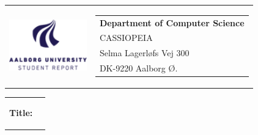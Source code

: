 \thispagestyle{empty}
\begin{titlepage}
    \setlength{\textwidth}{15cm}
    \noindent
    \begin{nopagebreak}
        {\samepage 
            \begin{tabular}{lr}
                \parbox{0.5\textwidth}{\raisebox{11mm}
                    {\includegraphics[height=2.2cm]{Grafik/aauLogoDa2}}
                } &
                \parbox{0.5\textwidth}{
                    \small
                    \begin{tabular}{l}
                        {\sf\small \textbf{Department of Computer Science }}\\
                        {\sf\small CASSIOPEIA} \\
                        {\sf\small Selma Lagerløfs Vej 300} \\
                        {\sf\small DK-9220 Aalborg Ø.} \\
                    \end{tabular}
                }
            \end{tabular}
            
            \noindent
            \begin{tabular}{cc}
                \parbox{7cm}{
                    \begin{description}
            
                        \item {\bf Title:} 
            

\end{description}}
\end{tabular}}
\end{nopagebreak}
\end{titlepage}

